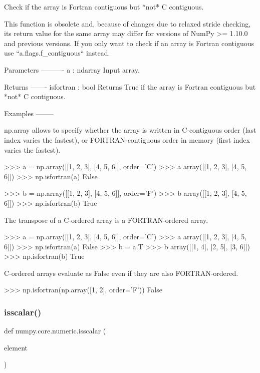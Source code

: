 \begin{DoxyVerb}Check if the array is Fortran contiguous but *not* C contiguous.

This function is obsolete and, because of changes due to relaxed stride
checking, its return value for the same array may differ for versions
of NumPy >= 1.10.0 and previous versions. If you only want to check if an
array is Fortran contiguous use ``a.flags.f_contiguous`` instead.

Parameters
----------
a : ndarray
    Input array.

Returns
-------
isfortran : bool
    Returns True if the array is Fortran contiguous but *not* C contiguous.


Examples
--------

np.array allows to specify whether the array is written in C-contiguous
order (last index varies the fastest), or FORTRAN-contiguous order in
memory (first index varies the fastest).

>>> a = np.array([[1, 2, 3], [4, 5, 6]], order='C')
>>> a
array([[1, 2, 3],
       [4, 5, 6]])
>>> np.isfortran(a)
False

>>> b = np.array([[1, 2, 3], [4, 5, 6]], order='F')
>>> b
array([[1, 2, 3],
       [4, 5, 6]])
>>> np.isfortran(b)
True


The transpose of a C-ordered array is a FORTRAN-ordered array.

>>> a = np.array([[1, 2, 3], [4, 5, 6]], order='C')
>>> a
array([[1, 2, 3],
       [4, 5, 6]])
>>> np.isfortran(a)
False
>>> b = a.T
>>> b
array([[1, 4],
       [2, 5],
       [3, 6]])
>>> np.isfortran(b)
True

C-ordered arrays evaluate as False even if they are also FORTRAN-ordered.

>>> np.isfortran(np.array([1, 2], order='F'))
False\end{DoxyVerb}
 \mbox{\label{namespacenumpy_1_1core_1_1numeric_a505e4f3fa802a70c6090e5e23124f847}} 
\subsubsection{\texorpdfstring{isscalar()}{isscalar()}}
{\footnotesize\ttfamily def numpy.\+core.\+numeric.\+isscalar (\begin{DoxyParamCaption}\item[{}]{element }\end{DoxyParamCaption})}

